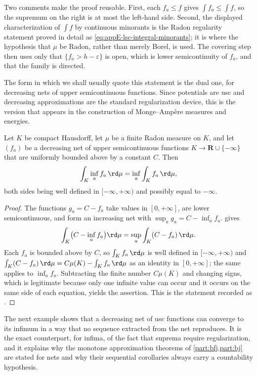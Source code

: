 Two comments make the proof reusable.  First, each $f_a\leq f$ gives
$\int f_a\leq\int f$, so the supremum on the right is at most the left-hand
side.  Second, the displayed characterization
of $\int f$ by continuous minorants is the Radon regularity statement proved
in detail as \eqref{eq:appE-lsc-integral-minorants}; it is where the
hypothesis that $\mu$ be Radon, rather than merely Borel, is used.  The
covering step then uses only that $\{f_a>h-\varepsilon\}$ is open, which is
lower semicontinuity of $f_a$, and that the family is directed.

The form in which we shall usually quote this statement is the dual one, for
decreasing nets of upper semicontinuous functions.  Since potentials are usc
and decreasing approximations are the standard regularization device, this is
the version that appears in the construction of Monge--Amp\`ere measures and
energies.

\begin{corollary}\label{cor:usc-net-monotone-integral}
Let $K$ be compact Hausdorff, let $\mu$ be a finite Radon measure on $K$, and
let $(f_a)$ be a decreasing net of upper semicontinuous functions
$K\to\mathbf R\cup\{-\infty\}$ that are uniformly bounded above by a constant
$C$.  Then
\[
 \int_K\inf_af_a\,\rd\mu=\inf_a\int_Kf_a\,\rd\mu,
\]
both sides being well defined in $[-\infty,+\infty)$ and possibly equal to
$-\infty$.
\end{corollary}

\begin{proof}
The functions $g_a=C-f_a$ take values in $[0,+\infty]$, are lower
semicontinuous, and form an increasing net with
$\sup_ag_a=C-\inf_af_a$.   gives
\[
 \int_K\bigl(C-\inf_af_a\bigr)\rd\mu=\sup_a\int_K(C-f_a)\,\rd\mu .
\]
Each $f_a$ is bounded above by $C$, so $\int_Kf_a\,\rd\mu$ is well defined in
$[-\infty,+\infty)$ and
$\int_K(C-f_a)\,\rd\mu=C\mu(K)-\int_Kf_a\,\rd\mu$ as an identity in
$[0,+\infty]$; the same applies to $\inf_af_a$.  Subtracting the finite
number $C\mu(K)$ and changing signs, which is legitimate because only one
infinite value can occur and it occurs on the same side of each equation,
yields the assertion.  This is the statement recorded as
.
\end{proof}

The next example shows that a decreasing net of usc functions can converge to
its infimum in a way that no sequence extracted from the net reproduces.  It
is the exact counterpart, for infima, of the fact that suprema require
regularization, and it explains why the monotone approximation theorems of
\cref{part:bfj,part:bj} are stated for nets and why their sequential
corollaries always carry a countability hypothesis.

